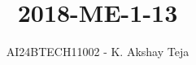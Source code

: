 \documentclass[journal,9pt,onecolumn]{IEEEtran}
\begin{document}

\vspace{3cm}
\title{2018-ME-1-13}
\author{AI24BTECH11002 - K. Akshay Teja}
\maketitle
 \bigskip
{\let\newpage\relax\maketitle}

\renewcommand{\thefigure}{\theenumi}
\renewcommand{\thetable}{\theenumi}
\setlength{\intextsep}{10pt} %

\renewcommand{\thetable}{\theenumi}
\end{document}
